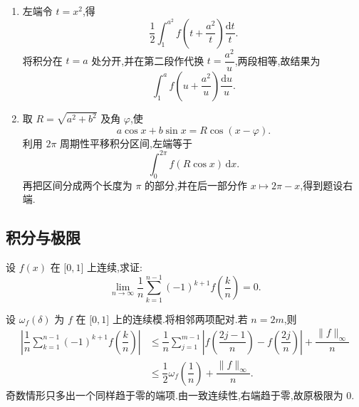 \begin{solution}
    \leavevmode
    \begin{enumerate}
        \item 左端令 $t=x^2$,得
              \[
                  \dfrac{1}{2}\int_1^{a^2}
                  f\left(t+\dfrac{a^2}{t}\right)\dfrac{\mathrm{d}t}{t}.
              \]
              将积分在 $t=a$ 处分开,并在第二段作代换 $t=\dfrac{a^2}{u}$,两段相等,故结果为
              \[
                  \displaystyle\int_1^a f\left(u+\dfrac{a^2}{u}\right)\dfrac{\mathrm{d}u}{u}.
              \]

        \item 取 $R=\sqrt{a^2+b^2}$ 及角 $\varphi$,使
              \[
                  a\cos x+b\sin x=R\cos(x-\varphi).
              \]
              利用 $2\pi$ 周期性平移积分区间,左端等于
              \[
                  \displaystyle\int_0^{2\pi}f(R\cos x)\,\mathrm{d}x.
              \]
              再把区间分成两个长度为 $\pi$ 的部分,并在后一部分作 $x\mapsto2\pi-x$,得到题设右端.
    \end{enumerate}
\end{solution}



\subsection{积分与极限}

\begin{example}
    设 $f(x)$ 在 $\lbrack 0,1\rbrack$ 上连续,求证:
    \[
        \displaystyle\lim\limits_{n\to\infty}\dfrac{1}{n}
        \sum\limits_{k=1}^{n-1}(-1)^{k+1}f\left(\dfrac{k}{n}\right)=0.
    \]
\end{example}
\exampleblank

\begin{solution}
    设 $\omega_f(\delta)$ 为 $f$ 在 $\lbrack0,1\rbrack$ 上的连续模.将相邻两项配对.若 $n=2m$,则
    \[
        \begin{aligned}
            \left|\dfrac{1}{n}\sum\limits_{k=1}^{n-1}
            (-1)^{k+1}f\left(\dfrac{k}{n}\right)\right|
             & \leq\dfrac{1}{n}\sum\limits_{j=1}^{m-1}
            \left|f\left(\dfrac{2j-1}{n}\right)
            -f\left(\dfrac{2j}{n}\right)\right|
            +\dfrac{\|f\|_\infty}{n}                             \\
             & \leq\dfrac{1}{2}\omega_f\left(\dfrac{1}{n}\right)
            +\dfrac{\|f\|_\infty}{n}.
        \end{aligned}
    \]
    奇数情形只多出一个同样趋于零的端项.由一致连续性,右端趋于零,故原极限为 $0$.
\end{solution}

